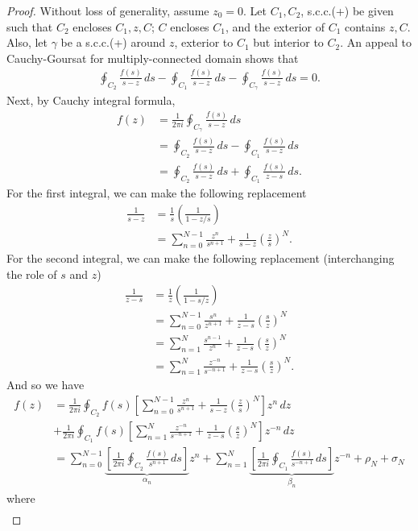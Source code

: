 \documentclass{article}
\theoremstyle{definition}
\newcommand{\f}[2]{\frac{#1}{#2}}
\newcommand{\lp}{\left(}
\newcommand{\rp}{\right)}
\newcommand{\lb}{\left[}
\newcommand{\rb}{\right]}
\newcommand{\nn}{\nonumber}
\begin{document}
\begin{proof}
	Without loss of generality, assume $z_0 = 0$. Let $C_1, C_2$, s.c.c.(+) be given such that $C_2$ encloses $C_1, z, C$; $C$ encloses $C_1$, and the exterior of $C_1$ contains $z, C$. Also, let $\gamma$ be a s.c.c.(+) around $z$, exterior to $C_1$ but interior to $C_2$. An appeal to Cauchy-Goursat for multiply-connected domain shows that
	\begin{align}
	\oint_{C_2}\f{f(s)}{s-z}\,ds - \oint_{C_1}\f{f(s)}{s-z}\,ds - \oint_{C_\gamma}\f{f(s)}{s-z}\,ds = 0.
	\end{align}
	Next, by Cauchy integral formula,
	\begin{align}
	f(z) &= \f{1}{2\pi i}\oint_{C_\gamma} \f{f(s)}{s-z}\,ds \nn\\
	&= \oint_{C_2}\f{f(s)}{s-z}\,ds - \oint_{C_1}\f{f(s)}{s-z}\,ds \nn\\
	&= \oint_{C_2}\f{f(s)}{s-z}\,ds + \oint_{C_1}\f{f(s)}{z-s}\,ds.
	\end{align}
	For the first integral, we can make the following replacement
	\begin{align}
	\f{1}{s-z} &= \f{1}{s}\lp \f{1}{1 - z/s} \rp \nn\\
	&= \sum^{N-1}_{n=0} \f{z^n}{s^{n+1}} + \f{1}{s-z}\lp\f{z}{s}\rp^N.
	\end{align}
	For the second integral, we can make the following replacement (interchanging the role of $s$ and $z$)
	\begin{align}
	\f{1}{z-s} &= \f{1}{z}\lp \f{1}{1 - s/z} \rp \nn\\
	&= \sum^{N-1}_{n=0} \f{s^n}{z^{n+1}} + \f{1}{z-s}\lp\f{s}{z}\rp^N\nn\\
	&= \sum^{N}_{n=1} \f{s^{n-1}}{z^{n}} + \f{1}{z-s}\lp\f{s}{z}\rp^N\nn\\
	&= \sum^N_{n=1}\f{z^{-n}}{s^{-n+1}} + \f{1}{z-s}\lp \f{s}{z} \rp^N.
	\end{align}
	And so we have
	\begin{align}
	f(z) &= \f{1}{2\pi i}\oint_{C_2}f(s)\lb \sum^{N-1}_{n=0} \f{z^n}{s^{n+1}} + \f{1}{s-z}\lp\f{z}{s}\rp^N  \rb z^n\,dz\nn\\
	 &+ \f{1}{2\pi i}\oint_{C_1}f(s)\lb \sum^N_{n=1}\f{z^{-n}}{s^{-n+1}} + \f{1}{z-s}\lp \f{s}{z} \rp^N \rb z^{-n}\,dz \nn\\
	 &= \sum^{N-1}_{n=0}\underbrace{\lb \f{1}{2\pi i}\oint_{C_2}\f{f(s)}{s^{n+1}}\,ds \rb}_{\alpha_n} z^n + \sum^N_{n=1}\underbrace{\lb \f{1}{2\pi i} \oint_{C_1}\f{f(s)}{s^{-n+1}}\,ds\rb}_{\beta_n} z^{-n} + \rho_N + \sigma_N
	\end{align}
	where
	\begin{align}

\end{align}
\end{proof}
\end{document}
